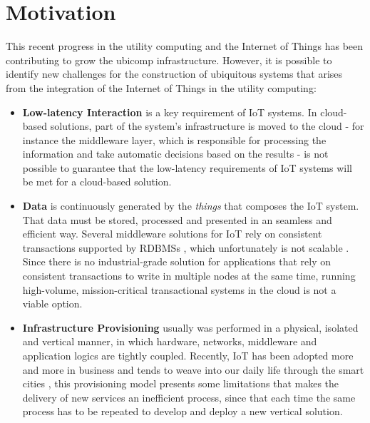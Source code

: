 \section{Motivation}
\label{section:motivation}
This recent progress in the utility computing and the Internet of Things has been contributing to grow the
\gls{ubicomp} infrastructure. However, it is possible to identify new challenges \cite{caceres2012ubicomp}
for the construction of ubiquitous systems that arises from the integration of the Internet of Things
in the utility computing:

\begin{itemize}
  \item \textbf{Low-latency Interaction} is a key requirement of \gls{IoT} systems. In cloud-based
  solutions, part of the system's infrastructure is moved to the cloud - for instance the middleware layer,
  which is responsible for processing the information and take automatic decisions based on the results
  - is not possible to guarantee that the low-latency requirements of \gls{IoT} systems will be
  met for a cloud-based solution.
  \item \textbf{Data} is continuously generated by the \textit{things} that composes the \gls{IoT}
  system. That data must be stored, processed and presented in an seamless and efficient way. Several
  middleware solutions for \gls{IoT} rely on consistent transactions supported by \glspl{RDBMS}
  \cite{floerkemeier2007rfid}\cite{eisenhauer2010hydra}\cite{de2008socrades}, which unfortunately is
  not scalable \cite{hofmann2010cloud}. Since there is no industrial-grade solution for applications
  that rely on consistent transactions to write in multiple nodes at the same time, running high-volume,
  mission-critical transactional systems in the cloud is not a viable option.
  \item \textbf{Infrastructure Provisioning} usually was performed in a physical, isolated and vertical
  manner, in which hardware, networks, middleware and application logics are tightly coupled. Recently,
  \gls{IoT} has been adopted more and more in business and tends to weave into our daily life through the smart cities
  \cite{caragliu2011smart}\cite{schaffers2011smart}, this provisioning model presents some limitations
  that makes the delivery of new services an inefficient process, since that each time the same process
  has to be repeated to develop and deploy a new vertical solution.

\end{itemize}
